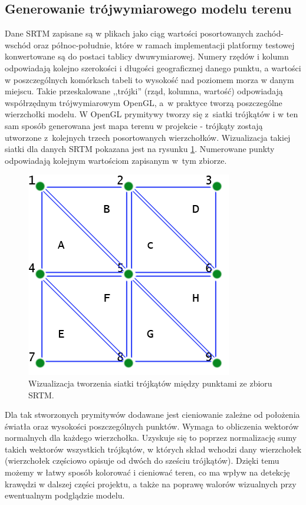 \subsection{Generowanie trójwymiarowego modelu terenu} \label{sec:szczegoly_generowanie_modelu}

Dane SRTM zapisane są w plikach jako ciąg wartości posortowanych zachód-wschód oraz północ-południe, które w ramach implementacji platformy testowej konwertowane są do postaci tablicy dwuwymiarowej. Numery rzędów i kolumn odpowiadają kolejno szerokości i długości geograficznej danego punktu, a wartości w poszczególnych komórkach tabeli to wysokość nad poziomem morza w danym miejscu. Takie przeskalowane ,,trójki'' (rząd, kolumna, wartość) odpowiadają współrzędnym trójwymiarowym OpenGL, a~w praktyce tworzą poszczególne wierzchołki modelu. W OpenGL prymitywy tworzy się z~siatki trójkątów i w ten sam sposób generowana jest mapa terenu w projekcie - trójkąty zostają utworzone z~kolejnych trzech posortowanych wierzchołków. Wizualizacja takiej siatki dla danych SRTM pokazana jest na rysunku \ref{fig:siatka}. Numerowane punkty odpowiadają kolejnym wartościom zapisanym w~tym zbiorze. 


\begin{figure}[!h]
    \centering \includegraphics[width=0.5\linewidth]{img/siatka.png}
    \caption{Wizualizacja tworzenia siatki trójkątów między punktami ze zbioru SRTM.}
    \label{fig:siatka}
\end{figure}

Dla tak stworzonych prymitywów dodawane jest cieniowanie zależne od położenia światła oraz wysokości poszczególnych punktów. Wymaga to obliczenia wektorów normalnych dla każdego wierzchołka. Uzyskuje się to poprzez normalizację sumy takich wektorów wszystkich trójkątów, w których skład wchodzi dany wierzchołek (wierzchołek częściowo opisuje od dwóch do sześciu trójkątów). Dzięki temu możemy w łatwy sposób kolorować i cieniować teren, co ma wpływ na detekcję krawędzi w dalszej części projektu, a także na poprawę walorów wizualnych przy ewentualnym podglądzie modelu.

